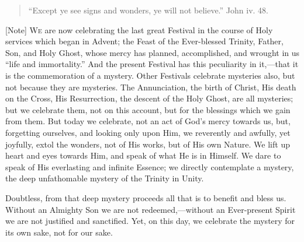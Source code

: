 
\begin{quote}

``Except ye see signs and wonders, ye will not believe.''
John iv. 48.

\end{quote}

[Note] W\textsc{e} are now celebrating the
last great Festival in the course of Holy services which began in
Advent; the Feast of the Ever-blessed Trinity, Father, Son, and Holy
Ghost, whose mercy has planned, accomplished, and wrought in us
``life and immortality.'' And the present Festival has this
peculiarity in it,—that it is the commemoration of a mystery. Other
Festivals celebrate mysteries also, but not because they are
mysteries. The Annunciation, the birth of Christ, His death on the
Cross, His Resurrection, the descent of the Holy Ghost, are all
mysteries; but we celebrate them, not on this account, but for the
blessings which we gain from them. But today we celebrate, not an act
of God's mercy towards us, but, forgetting ourselves, and looking only
upon Him, we reverently and awfully, yet joyfully, extol the wonders,
not of His works, but of His own Nature. We lift up heart and eyes
towards Him, and speak of what He is in Himself. We dare to speak of
His everlasting and infinite Essence; we directly contemplate a
mystery, the deep unfathomable mystery of the Trinity in Unity.

Doubtless, from that deep mystery proceeds all that is to benefit
and bless us. Without an Almighty Son we are not redeemed,—without
an Ever-present Spirit we are not justified and sanctified. Yet, on
this day, we celebrate the mystery for its own sake, not for our sake.

